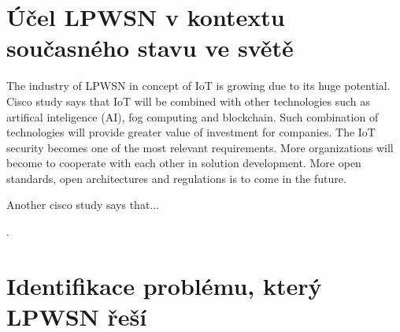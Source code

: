 \chapter{Účel LPWSN v kontextu současného stavu ve světě}





The industry of LPWSN in concept of IoT is growing due to its huge potential.
Cisco study \cite{IoT cisco study} says that IoT will be combined with other technologies such as artifical inteligence (AI), fog computing and blockchain. Such combination of technologies will provide greater value of investment for companies. 
The IoT security becomes one of the most relevant requirements.
More organizations will become to cooperate with each other in solution development.
More open standards, open architectures and regulations is to come in the future.

Another cisco study \cite{IoT cisco study 02} says that...




\cite{high density LPWAN}.










\chapter{Identifikace problému, který LPWSN řeší}